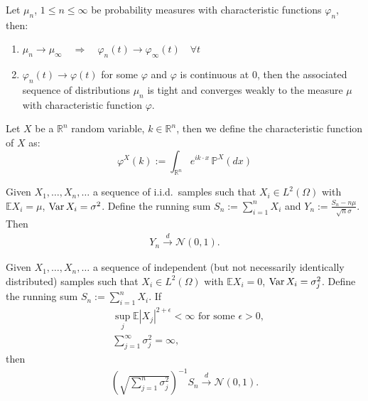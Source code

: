 \begin{theorem}
	Let $\mu_n$, $1\leq n \leq \infty$ be probability measures with characteristic functions $\varphi_n$, then:
	\begin{enumerate}
		\item $\mu_n \rightarrow \mu_\infty \quad \Rightarrow \quad \varphi_n(t) \rightarrow \varphi_\infty(t) \quad \forall t$
		\item $\varphi_n(t) \rightarrow \varphi(t)$ for some $\varphi$ and $\varphi$ is continuous at $0$, then the associated sequence of distributions $\mu_n$ is tight and converges weakly to the measure $\mu$ with characteristic function $\varphi$.
	\end{enumerate}
\end{theorem}

\begin{definition}
Let $X$ be a $\mathbb{R}^n$ random variable, $k \in \mathbb{R}^n$, then we define the characteristic function of $X$ as:
	\begin{equation*}
		\varphi^X(k) := \int_{\mathbb{R}^n} e^{i k \cdot x} \, \mathbb{P}^X(dx)
	\end{equation*}
\end{definition}

\begin{theorem}

\end{theorem}

\begin{theorem}
	Given $X_1, \dots, X_n, \dots$ a sequence of i.i.d.\ samples such that $X_i \in L^2(\Omega)$ with $\mathbb{E}X_i= \mu$, $\operatorname{Var} X_i = \sigma^2$. Define the running sum $S_n:= \sum_{i = 1}^n X_i$ and $Y_n:= \frac{S_n - n \mu}{\sqrt{n} \sigma}$. Then
	\begin{align*}
		Y_n \overset{d}{\longrightarrow} \mathcal{N}(0, 1).
	\end{align*}
\end{theorem}

\begin{theorem}
Given $X_1, \dots, X_n, \dots$ a sequence of independent (but not necessarily identically distributed) samples such that $X_i \in L^2(\Omega)$ with $\mathbb{E}X_i= 0$, $\operatorname{Var} X_i = \sigma^2_j$. Define the running sum $S_n:= \sum_{i = 1}^n X_i$. If
\begin{align*}
	&\sup_j \mathbb{E} |X_j|^{2 + \epsilon}< \infty \text{ for some } \epsilon >0, \\
	&\sum_{j = 1}^\infty \sigma_j^2 = \infty,
\end{align*}
then
\begin{align*}
	\left(\sqrt{\sum_{j = 1}^n \sigma_j^2}\right)^{-1} S_n \overset{d}{\longrightarrow} \mathcal{N}(0, 1).
\end{align*}
\end{theorem}

